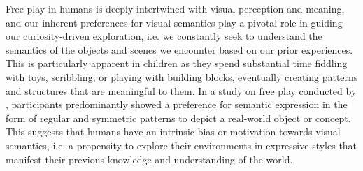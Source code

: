 



Free play in humans is deeply intertwined with visual perception and meaning, and our inherent preferences for visual semantics play a pivotal role in guiding our curiosity-driven exploration, i.e. we constantly seek to understand the semantics of the objects and scenes we encounter based on our prior experiences.
This is particularly apparent in children as they spend substantial time fiddling with toys, scribbling, or playing with building blocks, eventually creating patterns and structures that are meaningful to them.
In a study on free play conducted by \citet{diggs}, participants predominantly showed a preference for semantic expression in the form of regular and symmetric patterns to depict a real-world object or concept.
This suggests that humans have an intrinsic bias or motivation towards visual semantics, i.e. a propensity to explore their environments in expressive styles that manifest their previous knowledge and understanding of the world.

